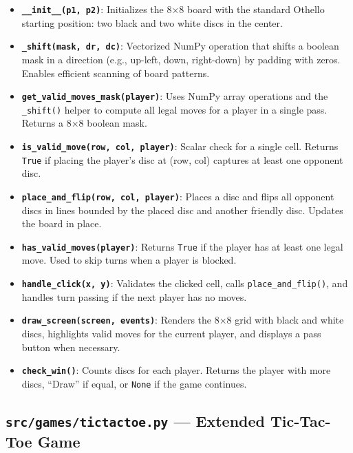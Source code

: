 \documentclass[12pt,a4paper]{article}
\begin{document}
\begin{itemize}
    \item \textbf{\texttt{\_\_init\_\_(p1, p2)}}: Initializes the 8×8 board with the standard Othello starting position: two black and two white discs in the center.
    
    \item \textbf{\texttt{\_shift(mask, dr, dc)}}: Vectorized NumPy operation that shifts a boolean mask in a direction (e.g., up-left, down, right-down) by padding with zeros. Enables efficient scanning of board patterns.
    
    \item \textbf{\texttt{get\_valid\_moves\_mask(player)}}: Uses NumPy array operations and the \texttt{\_shift()} helper to compute all legal moves for a player in a single pass. Returns a 8×8 boolean mask.
    
    \item \textbf{\texttt{is\_valid\_move(row, col, player)}}: Scalar check for a single cell. Returns \texttt{True} if placing the player's disc at (row, col) captures at least one opponent disc.
    
    \item \textbf{\texttt{place\_and\_flip(row, col, player)}}: Places a disc and flips all opponent discs in lines bounded by the placed disc and another friendly disc. Updates the board in place.
    
    \item \textbf{\texttt{has\_valid\_moves(player)}}: Returns \texttt{True} if the player has at least one legal move. Used to skip turns when a player is blocked.
    
    \item \textbf{\texttt{handle\_click(x, y)}}: Validates the clicked cell, calls \texttt{place\_and\_flip()}, and handles turn passing if the next player has no moves.
    
    \item \textbf{\texttt{draw\_screen(screen, events)}}: Renders the 8×8 grid with black and white discs, highlights valid moves for the current player, and displays a pass button when necessary.
    
    \item \textbf{\texttt{check\_win()}}: Counts discs for each player. Returns the player with more discs, ``Draw'' if equal, or \texttt{None} if the game continues.
\end{itemize}

\subsection{\texttt{src/games/tictactoe.py} — Extended Tic-Tac-Toe Game}
\end{document}
